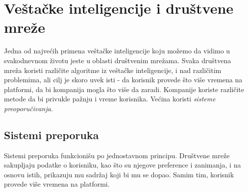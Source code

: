 \documentclass[a4paper]{article}
\newtheorem{primer}{Primer}[section]
\begin{document}

\section{Veštačke inteligencije i društvene mreže}
\label{sec:preporučivanje}

Jedna od najvećih primena veštačke inteligencije koju možemo da vidimo u svakodnevnom životu jeste u oblasti društvenim mrežama. Svaka društvena mreža koristi različite algoritme iz veštačke inteligencije, i nad različitim problemima,
ali cilj je skoro uvek isti - da korisnik provede što više vremena na platformi, da bi kompanija mogla što više da zaradi.
Kompanije koriste različite metode da bi privukle pažnju i vreme korisnika. Većina koristi \emph{sisteme preoporučivanja}.
\subsection{Sistemi preporuka}
Sistemi preporuka funkcionišu po jednostavnom principu. Društvene mreže sakupljaju podatke o korisniku, kao što su njegove preference i zanimanja, i na osnovu istih, prikazuju mu sadržaj koji bi mu se dopao. Samim tim, korisnik provede više vremena na platformi.
\end{document}
